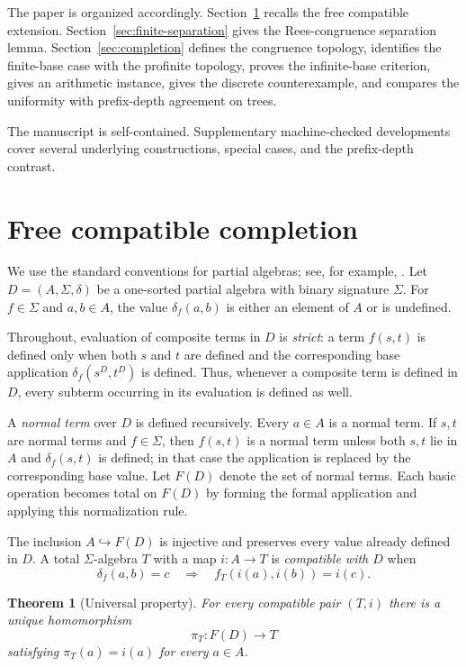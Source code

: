\documentclass{birkau}
\newtheorem{theorem}{Theorem}[section]
\theoremstyle{definition}
\theoremstyle{remark}
\begin{document}
The paper is organized accordingly.  Section~\ref{sec:free-completion} recalls
the free compatible extension.  Section~\ref{sec:finite-separation} gives the
Rees-congruence separation lemma.  Section~\ref{sec:completion} defines the
congruence topology, identifies the finite-base case with the profinite
topology, proves the infinite-base criterion, gives an arithmetic instance,
gives the discrete counterexample, and compares the uniformity with
prefix-depth agreement on trees.

The manuscript is self-contained.  Supplementary machine-checked developments
cover several underlying constructions, special cases, and the prefix-depth
contrast.

\section{Free compatible completion}\label{sec:free-completion}

We use the standard conventions for partial algebras; see, for example,
\cite{Burmeister1986}.  Let $D=(A,\Sigma,\delta)$ be a one-sorted partial
algebra with binary signature $\Sigma$.  For $f\in\Sigma$ and $a,b\in A$, the
value $\delta_f(a,b)$ is either an element of $A$ or is undefined.

Throughout, evaluation of composite terms in $D$ is \emph{strict}: a term
$f(s,t)$ is defined only when both $s$ and $t$ are defined and the corresponding
base application $\delta_f(s^D,t^D)$ is defined.  Thus, whenever a composite
term is defined in $D$, every subterm occurring in its evaluation is defined as
well.

A \emph{normal term} over $D$ is defined recursively.  Every $a\in A$ is a
normal term.  If $s,t$ are normal terms and $f\in\Sigma$, then $f(s,t)$ is a
normal term unless both $s,t$ lie in $A$ and $\delta_f(s,t)$ is defined; in
that case the application is replaced by the corresponding base value.  Let
$F(D)$ denote the set of normal terms.  Each basic operation becomes total on
$F(D)$ by forming the formal application and applying this normalization rule.

The inclusion $A\hookrightarrow F(D)$ is injective and preserves every value
already defined in $D$.  A total $\Sigma$-algebra $T$ with a map $i:A\to T$ is
\emph{compatible with $D$} when
\[
 \delta_f(a,b)=c
 \quad\Longrightarrow\quad
 f_T(i(a),i(b))=i(c).
\]

\begin{theorem}[Universal property]\label{thm:free-completion}
For every compatible pair $(T,i)$ there is a unique homomorphism
\[
 \pi_T:F(D)\longrightarrow T
\]
satisfying $\pi_T(a)=i(a)$ for every $a\in A$.
\end{theorem}
\end{document}
